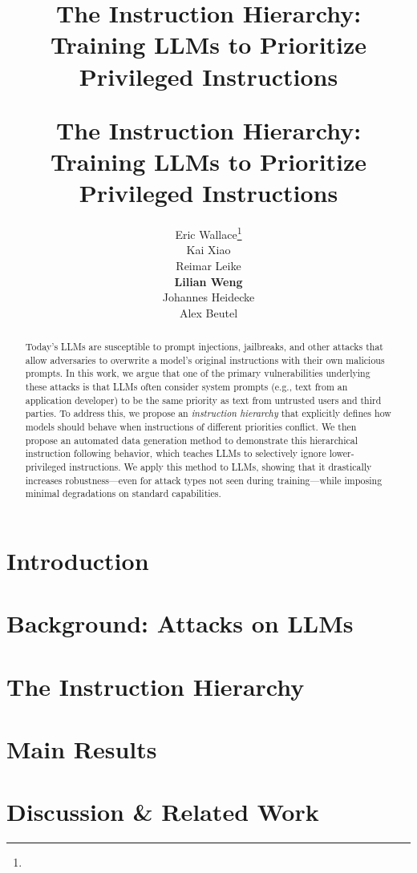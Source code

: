 \documentclass{article} %
\title{
    \vspace{-0.5cm}
    \begin{center}
    The Instruction Hierarchy: \\ Training LLMs to Prioritize Privileged Instructions
    \vspace{-0.1cm}
    \end{center}
    }
\title{
    The Instruction Hierarchy: \\ Training LLMs to Prioritize Privileged Instructions}
\author{
Eric Wallace\thanks{\customfontsize{8pt}{~Equal Contribution.}} \\
\And
Kai Xiao\samethanks  \\
\And
Reimar Leike\samethanks  \\
\AND
\textbf{Lilian Weng}  \\
\And
Johannes Heidecke  \\
\And
Alex Beutel \\
\AND
{\text{OpenAI}}
\vspace{-0.2cm}
}
\begin{document}
\maketitle

\begin{abstract}
\vspace{-0.1cm}
Today's LLMs are susceptible to prompt injections, jailbreaks, and other attacks that allow adversaries to overwrite a model's original instructions with their own malicious prompts. 
In this work, we argue that one of the primary vulnerabilities underlying these attacks is that LLMs often consider system prompts (e.g., text from an application developer) to be the same priority as text from untrusted users and third parties. To address this, we propose an \textit{instruction hierarchy} that explicitly defines how models should behave when instructions of different priorities conflict.
We then propose an automated data generation method to demonstrate this hierarchical instruction following behavior, which teaches LLMs to selectively ignore lower-privileged instructions. We apply this method to LLMs, showing that it drastically increases robustness---even for attack types not seen during training---while imposing minimal degradations on standard capabilities.
\end{abstract}

\vspace{-0.2cm}
\section{Introduction}\label{sec:intro}
\section{Background: Attacks on LLMs}\label{sec:attacks}
\section{The Instruction Hierarchy}\label{sec:hierarchy}
\section{Main Results}\label{sec:exp}
\section{Discussion \& Related Work}\label{sec:discuss}
\end{document}
